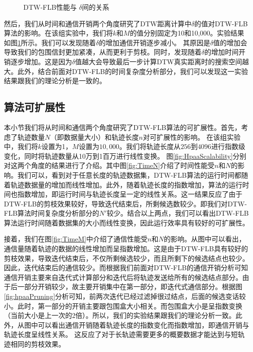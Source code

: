   \begin{figure}
  	\centering
  	\caption{DTW-FLB性能与 $\delta$间的关系}
  	\label{fig:DeltaImpact}
  \end{figure}
  
  然后，我们从时间和通信开销两个角度研究了DTW距离计算中$\delta$的值对DTW-FLB算法的影响。在该组实验中，我们将$k$和$M$的值分别固定为10和10,000。实验结果如图\ref{fig:DeltaImpact}所示。我们可以发现随着$\delta$的增加通信开销逐步减小。
  其原因是$\delta$值的增加会导致我们的包围信封更加紧凑，从而更利于剪枝。同时，发现随着$\delta$的增加时间开销逐步增加。这是因为$\delta$值越大会导致最后一步计算DTW真实距离时的搜索空间越大。此外，结合前面对DTW-FLB的时间复杂度分析部分，我们可以发现这一实验结果跟我们的理论分析是一致的。
  
 \subsection{算法可扩展性}

  本小节我们将从时间和通信两个角度研究了DTW-FLB算法的可扩展性。首先，考虑了轨迹数量$N$（即数据量大小）和轨迹长度$n$对可扩展性的影响。
  在该组实验中，我们将$k$设置为1，$M$设置为$10,000$。我们将轨迹长度从$256$到$4096$进行指数级变化，同时将轨迹数量从10万到1百万进行线性变换。
  图\ref{fig:HpaaScalability}分别对这两个角度的结果进行了介绍。其中图\ref{fig:TimeN}介绍了时间性能受$n$和$N$的影响。我们可以，看到对于任意长度的轨迹数据集，DTW-FLB算法的运行时间都随着轨迹数据量的增加而线性增加。此外，随着轨迹长度的指数增加，算法的运行时间也指数增加，即运行时间与轨迹长度呈一定的线性关系。这一结果反应了由于DTW-FLB的剪枝效果较好，导致迭代结束后，所剩候选数较少。即我们对DTW-FLB算法时间复杂度分析部分的$N'$较少。结合以上两点，我们可以看出DTW-FLB算法运行时间随着数据集的大小而线性变换，因此运行效率具有较好的可扩展性。
  
  接着，我们在图\ref{fig:TimeM}中介绍了通信性能受$n$和$N$的影响。从图中可以看出，通信量随着轨迹的数据的线性增加而呈指数增加。这是由于DTW-FLB具有较好的剪枝效果，导致迭代结束后，不仅所剩候选较少，而且所剩下的候选结点也较少。因此，迭代结束后的通信较少。而根据我们前面对DTW-FLB的通信开销分析可知通信开销主要来自迭代式计算部分和迭代后将轨迹发送给所有的候选结点部分。由于后一部分开销较少，故主要开销集中在第一部分，即迭代式通信部分。根据图\ref{fig:hpaaPruning}分析可知，前两次迭代已经过滤掉很过结点，后面的候选变话较小。此时，第一部分的开销主要跟包围盒大小相关。而包围盒大小是呈指数变换（当前大小是上一次的2倍）。所以，我们的实验结果跟我们的理论分析一致。此外，从图中可以看出通信开销随着轨迹长度的指数变化而指数增加，即通信开销与轨迹长度呈线性关系。
   这反应了对于长轨迹需要更多的概要数据才能达到与短轨迹相同的剪枝效果。

